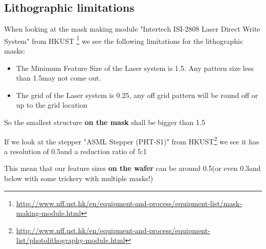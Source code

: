 \subsection{Lithographic limitations}
When looking at the mask making module "Intertech ISI-2808 Laser Direct Write System" from HKUST \footnote{\url{http://www.nff.ust.hk/en/equipment-and-process/equipment-list/mask-making-module.html}} we see the following limitations for the lithographic masks:
\begin{itemize}
	\item The Minimum Feature Size of the Laser system is 1.5\um. Any pattern size less than 1.5\um may not come out.
	\item The grid of the Laser system is 0.25\um, any off grid pattern will be round off or up to the grid location
\end{itemize}

So the smallest structure \textbf{on the mask} shall be bigger than 1.5\um

If we look at the stepper "ASML Stepper (PHT-S1)" from HKUST\footnote{\url{http://www.nff.ust.hk/en/equipment-and-process/equipment-list/photolithography-module.html}} we see it has a resolution of 0.5\um and a reduction ratio of 5:1

This mean that our feature sizes \textbf{on the wafer} can be around 0.5\um (or even 0.3\um and below with some trickery with multiple masks!)